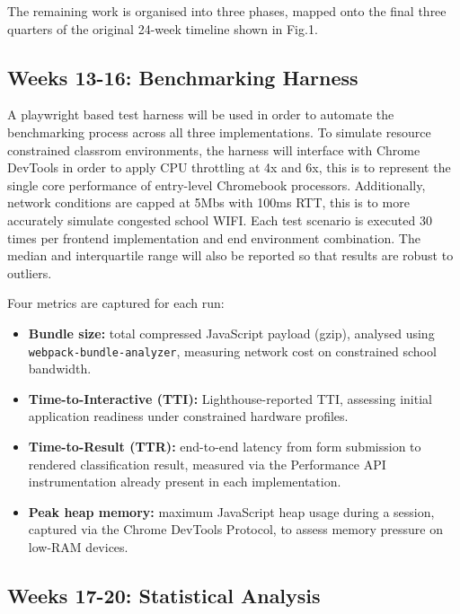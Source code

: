 \documentclass[conference]{IEEEtran}
\begin{document}
\medskip


The remaining work is organised into three phases, mapped onto the final
three quarters of the original 24-week timeline shown in Fig.1.

\subsection{Weeks 13-16: Benchmarking Harness}

A playwright based test harness will be used in order to automate the benchmarking process across all three implementations. To simulate resource constrained classrom environments, the harness will interface with Chrome DevTools in order to apply CPU throttling at 4x and 6x, this is to represent the single core performance of entry-level Chromebook processors. Additionally, network conditions are capped at 5Mbs with 100ms RTT, this is to more accurately simulate congested school WIFI. Each test scenario is executed 30 times per frontend implementation and end environment combination. The median and interquartile range will also be reported so that results are robust to outliers. 

\medskip

Four metrics are captured for each run:

\medskip

\begin{itemize}
  \item \textbf{Bundle size:} total compressed JavaScript payload (gzip),
  analysed using \texttt{webpack-bundle-analyzer}, measuring network cost
  on constrained school bandwidth.
  \item \textbf{Time-to-Interactive (TTI):} Lighthouse-reported TTI,
  assessing initial application readiness under constrained hardware
  profiles.
  \item \textbf{Time-to-Result (TTR):} end-to-end latency from form
  submission to rendered classification result, measured via the
  Performance API instrumentation already present in each implementation.
  \item \textbf{Peak heap memory:} maximum JavaScript heap usage during a
  session, captured via the Chrome DevTools Protocol, to assess memory
  pressure on low-RAM devices.
\end{itemize}

\medskip

\subsection{Weeks 17-20: Statistical Analysis}
\end{document}
